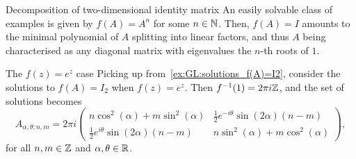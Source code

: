 \begin{examplebox}[label={ex:GL:solutions_f(A)=I2}]{Decomposition of two-dimensional identity matrix}
An easily solvable class of examples is given by $f(A)=A^n$ for some $n\in{\mathbb{N}}$. Then, $f(A)=I$ amounts to the minimal polynomial of $A$ splitting into linear factors, and thus $A$ being characterised as any diagonal matrix with eigenvalues the $n$-th roots of $1$.
\end{examplebox}



\begin{examplebox}[label={ex:GL:solutions_e^A=I2}]{The $f(z)=e^z$ case}
\fontsize{10pt}{10pt}\selectfont
Picking up from~\cref{ex:GL:solutions_f(A)=I2}, consider the solutions to $f(A)=I_2$ when $f(z)=e^z$.
Then $f^{-1}(1)=2\pi i{\mathbb{Z}}$, and the set of solutions becomes
\begin{equation}
    A_{\alpha,\theta;n,m} = 2\pi i
    \begin{pmatrix}
        n \cos^2(\alpha)+m\sin^2(\alpha) &
        \frac12 e^{-i\theta} \sin(2\alpha) (n-m) \\ 
        \frac12 e^{i\theta} \sin(2\alpha) (n-m) &
        n \sin^2(\alpha)+m\cos^2(\alpha)
    \end{pmatrix},
\end{equation}
for all $n,m\in{\mathbb{Z}}$ and $\alpha,\theta\in{\mathbb{R}}$.
\end{examplebox}

